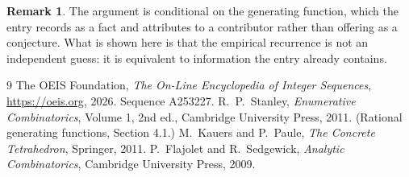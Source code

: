 \documentclass[11pt,a4paper]{article}
\theoremstyle{plain}
\theoremstyle{definition}
\newtheorem{remark}[theorem]{Remark}
\begin{document}
\begin{remark}
The argument is conditional on the generating function, which the entry records as a fact and
attributes to a contributor rather than offering as a conjecture. What is shown here is that
the empirical recurrence is not an independent guess: it is equivalent to information the
entry already contains.
\end{remark}

\begin{thebibliography}{9}
 The OEIS Foundation, \emph{The On-Line Encyclopedia of Integer
Sequences}, \url{https://oeis.org}, 2026. Sequence A253227.
 R.~P.~Stanley, \emph{Enumerative Combinatorics}, Volume 1, 2nd ed.,
Cambridge University Press, 2011. (Rational generating functions, Section 4.1.)
 M.~Kauers and P.~Paule, \emph{The Concrete Tetrahedron}, Springer, 2011.
 P.~Flajolet and R.~Sedgewick, \emph{Analytic Combinatorics}, Cambridge
University Press, 2009.
\end{thebibliography}
\end{document}

